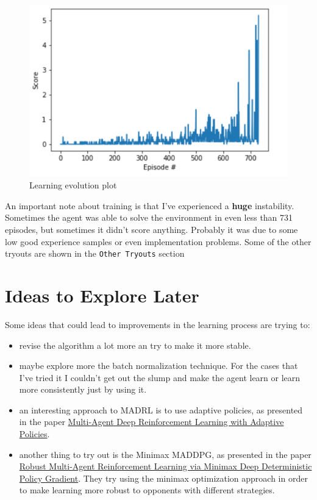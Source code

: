 \documentclass[
]{article}
\begin{document}
\begin{figure}
\centering
\includegraphics{imgs/results_2.png}
\caption{Learning evolution plot}
\end{figure}

An important note about training is that I've experienced a
\textbf{huge} instability. Sometimes the agent was able to solve the
environment in even less than 731 episodes, but sometimes it didn't
score anything. Probably it was due to some low good experience samples
or even implementation problems. Some of the other tryouts are shown in
the \texttt{Other\ Tryouts} section

\pagebreak

\hypertarget{ideas-to-explore-later}{%
\section{Ideas to Explore Later}\label{ideas-to-explore-later}}

Some ideas that could lead to improvements in the learning process are
trying to:

\begin{itemize}
\item
  revise the algorithm a lot more an try to make it more stable.
\item
  maybe explore more the batch normalization technique. For the cases
  that I've tried it I couldn't get out the slump and make the agent
  learn or learn more consistently just by using it.
\item
  an interesting approach to MADRL is to use adaptive policies, as
  presented in the paper
  \href{https://arxiv.org/pdf/1912.00949v1.pdf}{Multi-Agent Deep
  Reinforcement Learning with Adaptive Policies}.
\item
  another thing to try out is the Minimax MADDPG, as presented in the
  paper
  \href{http://aima.eecs.berkeley.edu/~russell/papers/aaai19-marl.pdf}{Robust
  Multi-Agent Reinforcement Learning via Minimax Deep Deterministic
  Policy Gradient}. They try using the minimax optimization approach in
  order to make learning more robust to opponents with different
  strategies.
\end{itemize}
\end{document}
